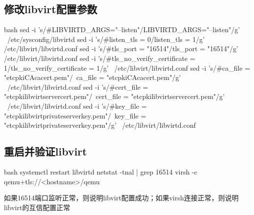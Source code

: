 \subsection{修改libvirt配置参数}

\begin{code-block}{bash}
sed -i 's/#LIBVIRTD_ARGS="--listen"/LIBVIRTD_ARGS="--listen"/g' \
    /etc/sysconfig/libvirtd
sed -i 's/#listen_tls = 0/listen_tls = 1/g' /etc/libvirt/libvirtd.conf
sed -i 's/#tls_port = "16514"/tls_port = "16514"/g' /etc/libvirt/libvirtd.conf
sed -i 's/#tls_no_verify_certificate = 1/tls_no_verify_certificate = 1/g' \
    /etc/libvirt/libvirtd.conf
sed -i 's/#ca_file = "\/etc\/pki\/CA\/cacert.pem"/\
ca_file = "\/etc\/pki\/CA\/cacert.pem"/g' \
    /etc/libvirt/libvirtd.conf
sed -i 's/#cert_file = "\/etc\/pki\/libvirt\/servercert.pem"/\
cert_file = "\/etc\/pki\/libvirt\/servercert.pem"/g' \
    /etc/libvirt/libvirtd.conf
sed -i 's/#key_file = "\/etc\/pki\/libvirt\/private\/serverkey.pem"/\
key_file = "\/etc\/pki\/libvirt\/private\/serverkey.pem"/g' \
    /etc/libvirt/libvirtd.conf
\end{code-block}

\subsection{重启并验证libvirt}
\begin{code-block}{bash}
systemctl restart libvirtd
netstat -tnal | grep 16514
virsh -c qemu+tls://<hostname>/qemu
\end{code-block}
如果16514端口监听正常，则说明libvirt配置成功；如果virsh连接正常，则说明libvirt的互信配置正常